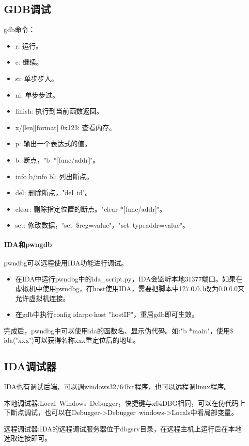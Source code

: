 \subsection{GDB调试}
gdb命令：
\begin{itemize}
    \item r: 运行。
    \item c: 继续。
    \item si: 单步步入。
    \item ni: 单步步过。
    \item finish: 执行到当前函数返回。
    \item x/[len][format] 0x123: 查看内存。
    \item p: 输出一个表达式的值。
    \item b: 断点，"b\ *[func/addr]"。
    \item info b/info bl: 列出断点。
    \item del: 删除断点，"del\ id"。
    \item clear: 删除指定位置的断点。"clear *[func/addr]"。
    \item set: 修改数据，"set\ $\$$reg=value"，"set\ {type}addr=value"。
\end{itemize}

\paragraph*{IDA和pwngdb} pwndbg可以远程使用IDA功能进行调试。
\begin{itemize}
    \item 在IDA中运行pwndbg中的ida\_script.py，IDA会监听本地31377端口。如果在虚拟机中使用pwndbg，在host使用IDA，需要把脚本中127.0.0.1改为0.0.0.0来允许虚拟机连接。
    \item 在gdb中执行config idarpc-host "hostIP"，重启gdb即可生效。
\end{itemize}
完成后，pwndbg中可以使用ida的函数名、显示伪代码。如:"b *main"，使用$\$$ida("xxx")可以获得名称xxx重定位后的地址。

\subsection{IDA调试器}
IDA也有调试后端，可以调windows32/64bit程序，也可以远程调linux程序。

本地调试器:Local\ Windows\ Debugger，快捷键与x64DBG相同，可以在伪代码上下断点调试，也可以在Debugger->Debugger\ windows->Locals中看局部变量。

远程调试器:IDA的远程调试服务器位于dbgsrv目录，在远程主机上运行后在本地选取连接即可。